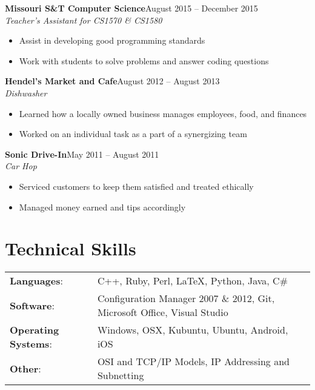\documentclass[margin]{res}
\begin{document}
\begin{resume}
    \textbf{Missouri S\&T Computer Science}\hfill August 2015 -- December 2015\\
       \textit{Teacher's Assistant for CS1570 \& CS1580} 
       \begin{itemize} \itemsep -1pt  %
         \item Assist in developing good programming standards
         \item Work with students to solve problems and answer coding questions
       \end{itemize}
       
    \textbf{Hendel's Market and Cafe}\hfill August 2012 -- August 2013\\
       \textit{Dishwasher} 
       \begin{itemize} \itemsep -1pt  %
         \item Learned how a locally owned business manages employees, food, and finances
         \item Worked on an individual task as a part of a synergizing team
       \end{itemize}
     
     \textbf{Sonic Drive-In}\hfill May 2011 -- August 2011\\
       \textit{Car Hop} 
       \begin{itemize} \itemsep -1pt  %
         \item Serviced customers to keep them satisfied and treated ethically
         \item Managed money earned and tips accordingly
       \end{itemize}

    \section{Technical Skills}
      \begin{tabular}{l p{3.6in}}
        \textbf{Languages}:                   & C++, Ruby, Perl, \LaTeX, Python, Java, C\# \\ [1pt]
        \textbf{Software}:                    & Configuration Manager 2007 \& 2012, Git, Microsoft Office, Visual Studio \\ [1pt]

        \textbf{Operating Systems}:           & Windows, OSX, Kubuntu, Ubuntu, Android, iOS \\ [1pt]
        \textbf{Other}:                       & OSI and TCP/IP Models, IP Addressing and Subnetting \\ [1pt]
      \end{tabular}


\end{resume}
\end{document}

